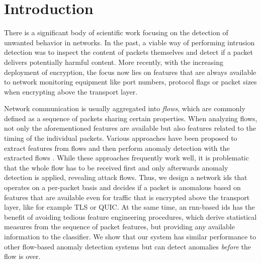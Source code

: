 \documentclass[conference]{IEEEtran}
\begin{document}
\maketitle

\section{Introduction}

There is a significant body of scientific work focusing on the detection of unwanted behavior in networks. In the past, a viable way of performing intrusion detection was to inspect the content of packets themselves and detect if a packet delivers potentially harmful content. More recently, with the increasing deployment of encryption, %
the focus now lies on features that are always available to network monitoring equipment like port numbers, protocol flags or packet sizes when encrypting above the transport layer.

Network communication is usually aggregated into \textit{flows}, which are commonly defined as a sequence of packets sharing certain properties. %
When analyzing flows, not only the aforementioned features are available but also features related to the timing of the individual packets. %
Various approaches have been proposed to extract features from flows and then perform anomaly detection with the extracted flows \cite{meghdouri_analysis_2018}.
While these approaches frequently work well, it is problematic that the whole flow has to be received first and only afterwards anomaly detection is applied, revealing attack flows. Thus, we design a network \gls{ids} that operates on a per-packet basis and decides if a packet is anomalous based on features that are available even for traffic that is encrypted above the transport layer, like for example TLS or QUIC.
At the same time, an \gls{rnn}-based \gls{ids} has the benefit of avoiding tedious feature engineering procedures, which derive statistical measures from the sequence of packet features, but providing any available information to the classifier.
We show that our system has similar performance to other flow-based anomaly detection systems but can detect anomalies \textit{before} the flow is over.
\end{document}
